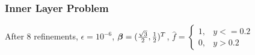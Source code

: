 \documentclass{beamer}
\begin{document}
\begin{frame}
\frametitle{Inner Layer Problem}
After 8 refinements, $\epsilon=10^{-6}$,
$\boldsymbol\beta=(\frac{\sqrt{3}}{2},\frac{1}{2})^T$, $\hat f=
\begin{cases}
1, & y <=0.2\\
0, & y > 0.2
\end{cases}$
\end{frame}
\end{document}
